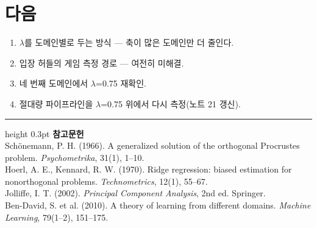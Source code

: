 \documentclass[10pt]{article}
\begin{document}
\section{다음}

\begin{enumerate}[leftmargin=1.3em,itemsep=0.15em]
\item $\lambda$를 도메인별로 두는 방식 --- 축이 많은 도메인만 더 줄인다.
\item 입장 허들의 게임 측정 경로 --- 여전히 미해결.
\item 네 번째 도메인에서 $\lambda$=0.75 재확인.
\item 절대량 파이프라인을 $\lambda$=0.75 위에서 다시 측정(노트 21 갱신).
\end{enumerate}

\vspace{0.6em}
\hrule height 0.3pt
\vspace{0.5em}
{\footnotesize
\textbf{참고문헌}\\[0.3em]
Schönemann, P. H. (1966). A generalized solution of the orthogonal Procrustes
problem. \emph{Psychometrika}, 31(1), 1--10.\\[0.15em]
Hoerl, A. E., Kennard, R. W. (1970). Ridge regression: biased estimation for
nonorthogonal problems. \emph{Technometrics}, 12(1), 55--67.\\[0.15em]
Jolliffe, I. T. (2002). \emph{Principal Component Analysis}, 2nd ed. Springer.\\[0.15em]
Ben-David, S. et al. (2010). A theory of learning from different domains.
\emph{Machine Learning}, 79(1--2), 151--175.
}
\end{document}

